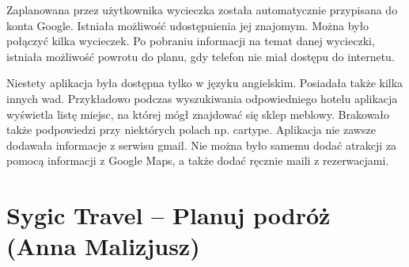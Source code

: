 \documentclass[10pt,twoside,a4paper]{report}
\begin{document}
\par Zaplanowana przez użytkownika wycieczka została automatycznie przypisana do konta Google. Istniała możliwość udostępnienia jej znajomym. Można było połączyć kilka wycieczek. Po pobraniu informacji na temat danej wycieczki, istniała możliwość powrotu do planu, gdy telefon nie miał dostępu do internetu.
\par Niestety aplikacja była dostępna tylko w języku angielskim. Posiadała także kilka innych wad. Przykładowo podczas wyszukiwania odpowiedniego hotelu aplikacja wyświetla listę miejsc, na której mógł znajdować się sklep meblowy. Brakowało także podpowiedzi przy niektórych polach np. cartype. Aplikacja nie zawsze dodawała informacje z serwisu gmail. Nie można było samemu dodać atrakcji za pomocą informacji z Google Maps, a także dodać ręcznie maili z rezerwacjami.

\section{Sygic Travel -- Planuj podróż (Anna Malizjusz)}
\end{document}
